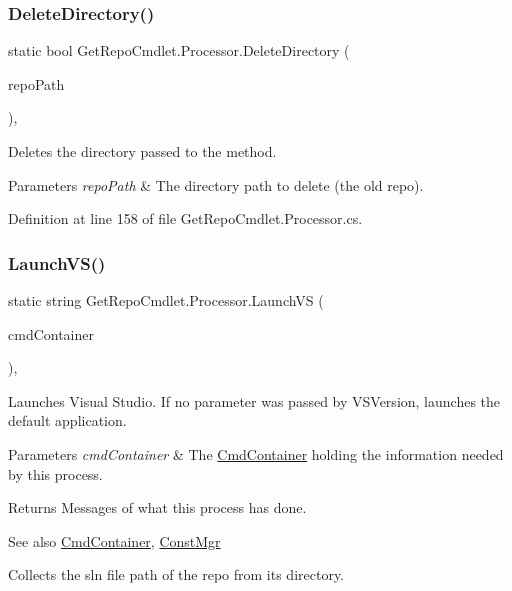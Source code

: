 \subsubsection{\texorpdfstring{Delete\+Directory()}{DeleteDirectory()}}
{\footnotesize\ttfamily static bool Get\+Repo\+Cmdlet.\+Processor.\+Delete\+Directory (\begin{DoxyParamCaption}\item[{string}]{repo\+Path }\end{DoxyParamCaption})\hspace{0.3cm}{\ttfamily [static]}, {\ttfamily [package]}}



Deletes the directory passed to the method. 


\begin{DoxyParams}{Parameters}
{\em repo\+Path} & The directory path to delete (the old repo).\\
\hline
\end{DoxyParams}


Definition at line 158 of file Get\+Repo\+Cmdlet.\+Processor.\+cs.

\mbox{\label{class_get_repo_cmdlet_1_1_processor_a0d3e38fbd41a8e6bdfbc62dcf4656e90}} 
\subsubsection{\texorpdfstring{Launch\+V\+S()}{LaunchVS()}}
{\footnotesize\ttfamily static string Get\+Repo\+Cmdlet.\+Processor.\+Launch\+VS (\begin{DoxyParamCaption}\item[{\mbox{\hyperlink{class_get_repo_cmdlet_1_1_cmd_container}{Cmd\+Container}}}]{cmd\+Container }\end{DoxyParamCaption})\hspace{0.3cm}{\ttfamily [static]}, {\ttfamily [package]}}



Launches Visual Studio. If no parameter was passed by V\+S\+Version, launches the default application. 


\begin{DoxyParams}{Parameters}
{\em cmd\+Container} & The \mbox{\hyperlink{class_get_repo_cmdlet_1_1_cmd_container}{Cmd\+Container}} holding the information needed by this process.\\
\hline
\end{DoxyParams}
\begin{DoxyReturn}{Returns}
Messages of what this process has done.
\end{DoxyReturn}
\begin{DoxySeeAlso}{See also}
\mbox{\hyperlink{class_get_repo_cmdlet_1_1_cmd_container}{Cmd\+Container}}, \mbox{\hyperlink{class_get_repo_cmdlet_1_1_const_mgr}{Const\+Mgr}}


\end{DoxySeeAlso}
Collects the sln file path of the repo from its directory. 

